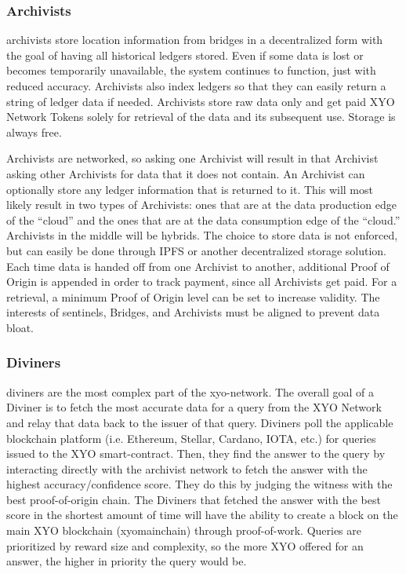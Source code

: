 \documentclass{article}
\begin{document}
\subsubsection{Archivists}

\Glspl{archivist} store location information from \Glspl{bridge} in a decentralized form with the goal of having all historical ledgers stored. Even if some data is lost or becomes temporarily unavailable, the system continues to function, just with reduced accuracy. Archivists also index ledgers so that they can easily return a string of ledger data if needed. Archivists store raw data only and get paid XYO Network Tokens solely for retrieval of the data and its subsequent use. Storage is always free.

Archivists are networked, so asking one Archivist will result in that Archivist asking other Archivists for data that it does not contain. An Archivist can optionally store any ledger information that is returned to it. This will most likely result in two types of Archivists: ones that are at the data production edge of the ``cloud'' and the ones that are at the data consumption edge of the ``cloud.'' Archivists in the middle will be hybrids. The choice to store data is not enforced, but can easily be done through IPFS or another decentralized storage solution. Each time data is handed off from one Archivist to another, additional Proof of Origin is appended in order to track payment, since all Archivists get paid. For a retrieval, a minimum Proof of Origin level can be set to increase validity. The interests of \Glspl{sentinel}, Bridges, and Archivists must be aligned to prevent data bloat.

\subsubsection{Diviners}

\Glspl{diviner} are the most complex part of the \Gls{xyo-network}. The overall goal of a Diviner is to fetch the most accurate data for a query from the XYO Network and relay that data back to the issuer of that query. Diviners poll the applicable blockchain platform (i.e. Ethereum, Stellar, Cardano, IOTA, etc.) for queries issued to the XYO \gls{smart-contract}. Then, they find the answer to the query by interacting directly with the \Gls{archivist} network to fetch the answer with the highest \gls{accuracy}/confidence score. They do this by judging the witness with the best \Gls{proof-of-origin} chain. The Diviners that fetched the answer with the best score in the shortest amount of time will have the ability to create a block on the main XYO blockchain (\Gls{xyomainchain}) through \Gls{proof-of-work}. Queries are prioritized by reward size and complexity, so the more XYO offered for an answer, the higher in priority the query would be.
\end{document}
